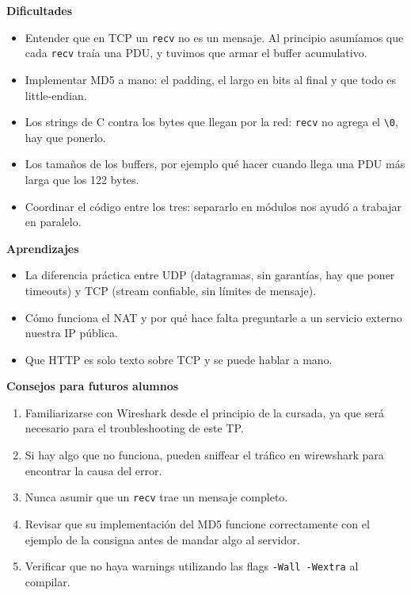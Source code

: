 \documentclass[11pt,a4paper]{article}
\begin{document}
\textbf{Dificultades}
\begin{itemize}
  \item Entender que en TCP un \texttt{recv} no es un mensaje. Al principio asumíamos que cada \texttt{recv} traía una PDU, y tuvimos que armar el buffer acumulativo.
  \item Implementar MD5 a mano: el padding, el largo en bits al final y que todo es little-endian.
  \item Los strings de C contra los bytes que llegan por la red: \texttt{recv} no agrega el \texttt{\textbackslash 0}, hay que ponerlo.
  \item Los tamaños de los buffers, por ejemplo qué hacer cuando llega una PDU más larga que los 122 bytes.
  \item Coordinar el código entre los tres: separarlo en módulos nos ayudó a trabajar en paralelo.
\end{itemize}

\textbf{Aprendizajes}
\begin{itemize}
  \item La diferencia práctica entre UDP (datagramas, sin garantías, hay que poner timeouts) y TCP (stream confiable, sin límites de mensaje).
  \item Cómo funciona el NAT y por qué hace falta preguntarle a un servicio externo nuestra IP pública.
  \item Que HTTP es solo texto sobre TCP y se puede hablar a mano.
\end{itemize}

\textbf{Consejos para futuros alumnos}
\begin{enumerate}
  \item Familiarizarse con Wireshark desde el principio de la cursada, ya que será necesario para el troubleshooting de este TP.
  \item Si hay algo que no funciona, pueden sniffear el tráfico en wirewshark para encontrar la causa del error.
  \item Nunca asumir que un \texttt{recv} trae un mensaje completo.
  \item Revisar que su implementación del MD5 funcione correctamente con el ejemplo de la consigna antes de mandar algo al servidor.
  \item Verificar que no haya warnings utilizando las flags \texttt{-Wall -Wextra} al compilar.
\end{enumerate}
\end{document}
